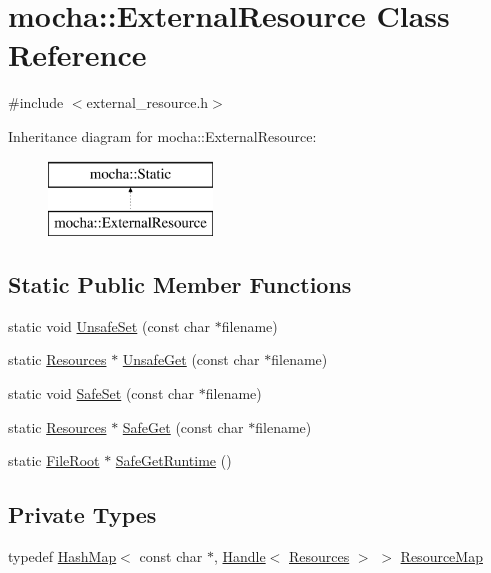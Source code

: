 \hypertarget{classmocha_1_1_external_resource}{
\section{mocha::ExternalResource Class Reference}
\label{classmocha_1_1_external_resource}
}


{\ttfamily \#include $<$external\_\-resource.h$>$}

Inheritance diagram for mocha::ExternalResource:\begin{figure}[H]
\begin{center}
\leavevmode
\includegraphics[height=2.000000cm]{classmocha_1_1_external_resource}
\end{center}
\end{figure}
\subsection*{Static Public Member Functions}
\begin{DoxyCompactItemize}
\item 
static void \hyperlink{classmocha_1_1_external_resource_a79ef20671c0a4b32c48d771c4785abd8}{UnsafeSet} (const char $\ast$filename)
\item 
static \hyperlink{classmocha_1_1_resources}{Resources} $\ast$ \hyperlink{classmocha_1_1_external_resource_ad9b2039a630d4d7fd4faed7c09c4eaab}{UnsafeGet} (const char $\ast$filename)
\item 
static void \hyperlink{classmocha_1_1_external_resource_afd20379c327ffe5396604545c78c066e}{SafeSet} (const char $\ast$filename)
\item 
static \hyperlink{classmocha_1_1_resources}{Resources} $\ast$ \hyperlink{classmocha_1_1_external_resource_a2d9388826910a37f40cc474ce1795f50}{SafeGet} (const char $\ast$filename)
\item 
static \hyperlink{classmocha_1_1_file_root}{FileRoot} $\ast$ \hyperlink{classmocha_1_1_external_resource_a648c5fe956b22d4a2dccc77f90a46827}{SafeGetRuntime} ()
\end{DoxyCompactItemize}
\subsection*{Private Types}
\begin{DoxyCompactItemize}
\item 
typedef \hyperlink{classmocha_1_1_hash_map}{HashMap}$<$ const char $\ast$, \hyperlink{classmocha_1_1_handle}{Handle}$<$ \hyperlink{classmocha_1_1_resources}{Resources} $>$ $>$ \hyperlink{classmocha_1_1_external_resource_af0eea09b4fa837b559799d0d6fa1ac95}{ResourceMap}
\end{DoxyCompactItemize}
